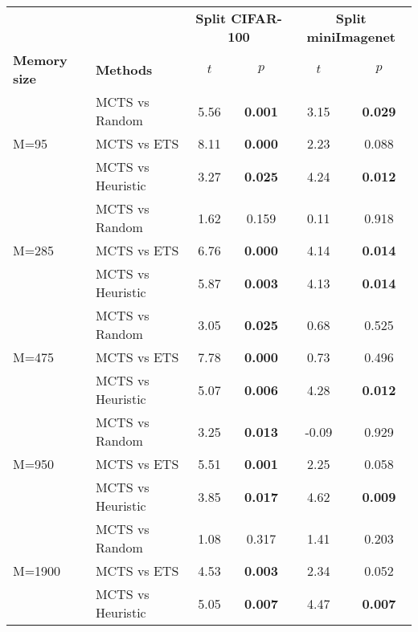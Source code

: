 \begin{tabular}{llcccc}
\toprule
\textbf{}               &                  & \multicolumn{2}{c}{\textbf{Split CIFAR-100}} & \multicolumn{2}{c}{\textbf{Split miniImagenet}} \\
\cmidrule(lr){3-4} \cmidrule(lr){5-6}
\textbf{Memory size}    & \textbf{Methods} & $t$                  & $p$                     & $t$                    & $p$                      \\
\midrule
\multirow{3}{*}{M=95}   & MCTS vs Random  & 5.56     & \textbf{0.001}    & 3.15       & \textbf{0.029}     \\
                        & MCTS vs ETS     & 8.11     & \textbf{0.000}    & 2.23       & 0.088              \\
                        & MCTS vs Heuristic & 3.27     & \textbf{0.025}    & 4.24       & \textbf{0.012}     \\
\midrule
\multirow{3}{*}{M=285}  & MCTS vs Random  & 1.62     & 0.159             & 0.11       & 0.918              \\
                        & MCTS vs ETS     & 6.76     & \textbf{0.000}    & 4.14       & \textbf{0.014}     \\
                        & MCTS vs Heuristic & 5.87     & \textbf{0.003}    & 4.13       & \textbf{0.014}     \\
\midrule
\multirow{3}{*}{M=475}  & MCTS vs Random  & 3.05     & \textbf{0.025}    & 0.68       & 0.525              \\
                        & MCTS vs ETS     & 7.78     & \textbf{0.000}    & 0.73       & 0.496              \\
                        & MCTS vs Heuristic & 5.07     & \textbf{0.006}    & 4.28       & \textbf{0.012}     \\
\midrule
\multirow{3}{*}{M=950}  & MCTS vs Random  & 3.25     & \textbf{0.013}    & -0.09      & 0.929              \\
                        & MCTS vs ETS     & 5.51     & \textbf{0.001}    & 2.25       & 0.058              \\
                        & MCTS vs Heuristic & 3.85     & \textbf{0.017}    & 4.62       & \textbf{0.009}     \\
\midrule
\multirow{3}{*}{M=1900} & MCTS vs Random  & 1.08     & 0.317             & 1.41       & 0.203              \\
                        & MCTS vs ETS     & 4.53     & \textbf{0.003}    & 2.34       & 0.052              \\
                        & MCTS vs Heuristic & 5.05     & \textbf{0.007}    & 4.47       & \textbf{0.007}    \\
\bottomrule
\end{tabular}